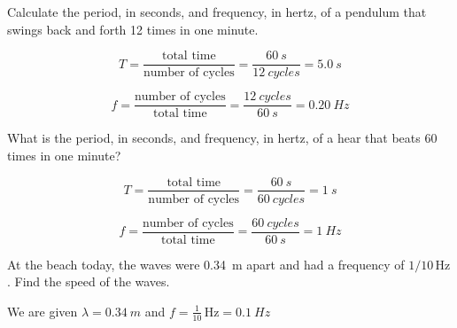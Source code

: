 \documentclass[]{exam}
\begin{document}
\begin{questions}
\question
Calculate the period, in seconds, and frequency, in hertz, of a pendulum that swings back and forth 12 times in one minute.

\begin{center}
\end{center}

\begin{solution}
\begin{equation*}
    T = \frac{\text{total time}}{\text{number of cycles}} = \frac{\SI{60}{s}}{\SI{12}{cycles}} = \boxed{\SI{5.0}{s}}
\end{equation*}

\begin{equation*}
    f = \frac{\text{number of cycles}}{\text{total time}} = \frac{\SI{12}{cycles}}{\SI{60}{s}} = \boxed{\SI{0.20}{Hz}}
\end{equation*}
\end{solution}

\question
What is the period, in seconds, and frequency, in hertz, of a hear that beats 60 times in one minute?

\begin{solution}
\begin{equation*}
    T = \frac{\text{total time}}{\text{number of cycles}} = \frac{\SI{60}{s}}{\SI{60}{cycles}} = \boxed{\SI{1}{s}}
\end{equation*}

\begin{equation*}
    f = \frac{\text{number of cycles}}{\text{total time}} = \frac{\SI{60}{cycles}}{\SI{60}{s}} = \boxed{\SI{1}{Hz}}
\end{equation*}

\end{solution}

\question
At the beach today, the waves were \SI{0.34}{m} apart and had a frequency of $1/10\,\text{Hz}$. Find the speed of the waves.

\begin{solution}
We are given $\lambda = \SI{0.34}{m}$ and $f = \frac{1}{10}\,\text{Hz} = \SI{0.1}{Hz}$


\end{solution}
\end{questions}
\end{document}
